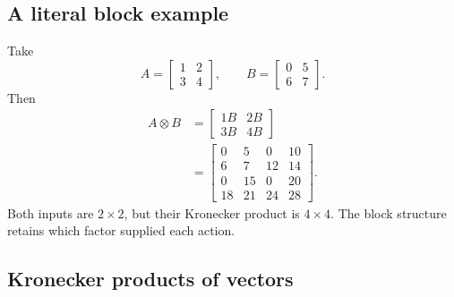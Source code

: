 \subsection{A literal block example}

Take
\begin{equation}
  A=
  \begin{bmatrix}
    1 & 2\\
    3 & 4
  \end{bmatrix},
  \qquad
  B=
  \begin{bmatrix}
    0 & 5\\
    6 & 7
  \end{bmatrix}.
\end{equation}
Then
\begin{align}
  A\otimes B
  &=
  \begin{bmatrix}
    1B & 2B\\
    3B & 4B
  \end{bmatrix}\\
  &=
  \begin{bmatrix}
    0 & 5 & 0 & 10\\
    6 & 7 & 12 & 14\\
    0 & 15 & 0 & 20\\
    18 & 21 & 24 & 28
  \end{bmatrix}.
\end{align}
Both inputs are \(2\times2\), but their Kronecker product is \(4\times4\).
The block structure retains which factor supplied each action.

\subsection{Kronecker products of vectors}

